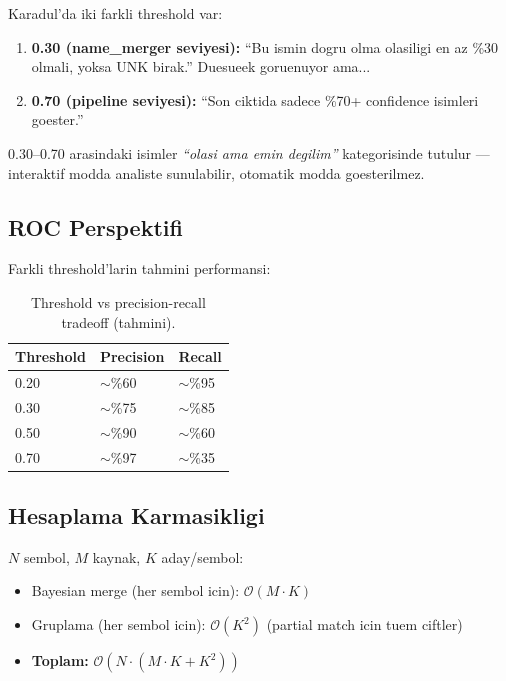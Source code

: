 \documentclass[12pt,a4paper,oneside]{book}
\theoremstyle{definition}
\newcommand{\bigO}[1]{\mathcal{O}\!\left(#1\right)}
\begin{document}
Karadul'da iki farkli threshold var:

\begin{enumerate}
\item \textbf{0.30 (name\_merger seviyesi):} ``Bu ismin dogru olma olasiligi en az \%30 olmali, yoksa UNK birak.'' Duesueek goruenuyor ama...
\item \textbf{0.70 (pipeline seviyesi):} ``Son ciktida sadece \%70+ confidence isimleri goester.''
\end{enumerate}

0.30--0.70 arasindaki isimler \textit{``olasi ama emin degilim''} kategorisinde tutulur --- interaktif modda analiste sunulabilir, otomatik modda goesterilmez.

\subsection{ROC Perspektifi}

Farkli threshold'larin tahmini performansi:

\begin{table}[ht]
\centering
\begin{tabular}{lll}
\toprule
\textbf{\color{sectioncyan}Threshold} & \textbf{\color{sectioncyan}Precision} & \textbf{\color{sectioncyan}Recall} \\
\midrule
0.20 & $\sim$\%60 & $\sim$\%95 \\
0.30 & $\sim$\%75 & $\sim$\%85 \\
0.50 & $\sim$\%90 & $\sim$\%60 \\
0.70 & $\sim$\%97 & $\sim$\%35 \\
\bottomrule
\end{tabular}
\caption{Threshold vs precision-recall tradeoff (tahmini).}
\end{table}

\subsection{Hesaplama Karmasikligi}

$N$ sembol, $M$ kaynak, $K$ aday/sembol:

\begin{itemize}
\item Bayesian merge (her sembol icin): $\bigO{M \cdot K}$
\item Gruplama (her sembol icin): $\bigO{K^2}$ (partial match icin tuem ciftler)
\item \textbf{Toplam:} $\bigO{N \cdot (M \cdot K + K^2)}$
\end{itemize}
\end{document}
